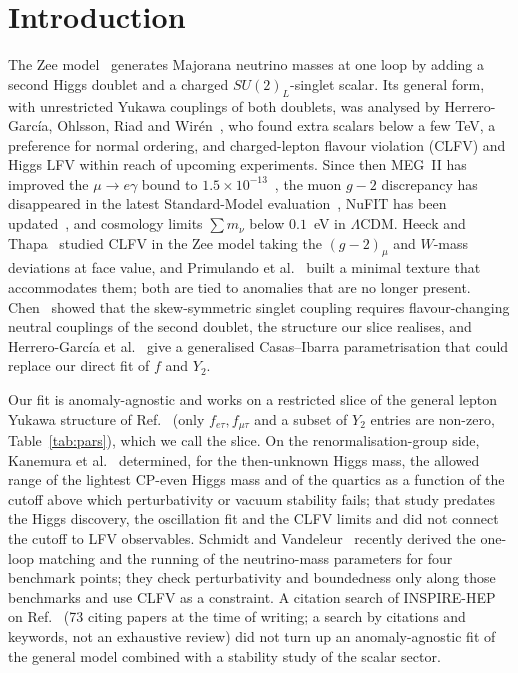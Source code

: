\documentclass[twocolumn,epjc3]{svjour3}
\newcommand{\HG}{Ref.~\cite{HerreroGarcia:2017xdq}}
\begin{document}
\section{Introduction}
The Zee model~\cite{Zee:1980ai} generates Majorana neutrino masses at one loop by adding a second Higgs doublet and a charged $SU(2)_L$-singlet scalar. Its general form, with unrestricted Yukawa couplings of both doublets, was analysed by Herrero-Garc\'ia, Ohlsson, Riad and Wir\'en~\cite{HerreroGarcia:2017xdq}, who found extra scalars below a few TeV, a preference for normal ordering, and charged-lepton flavour violation (CLFV) and Higgs LFV within reach of upcoming experiments. Since then MEG~II has improved the $\mu\to e\gamma$ bound to $1.5\times10^{-13}$~\cite{MEGII:2025gzr}, the muon $g-2$ discrepancy has disappeared in the latest Standard-Model evaluation~\cite{Aliberti:2025beg}, NuFIT has been updated~\cite{Esteban:2024eli}, and cosmology limits $\sum m_\nu$ below $0.1$~eV in $\Lambda$CDM. Heeck and Thapa~\cite{Heeck:2023soj} studied CLFV in the Zee model taking the $(g-2)_\mu$ and $W$-mass deviations at face value, and Primulando et al.~\cite{Primulando:2022vig} built a minimal texture that accommodates them; both are tied to anomalies that are no longer present. Chen~\cite{Chen:2025yuk} showed that the skew-symmetric singlet coupling requires flavour-changing neutral couplings of the second doublet, the structure our slice realises, and Herrero-Garc\'ia et al.~\cite{HerreroGarcia:2025ci} give a generalised Casas--Ibarra parametrisation that could replace our direct fit of $f$ and $Y_2$.

Our fit is anomaly-agnostic and works on a restricted slice of the general lepton Yukawa structure of \HG{} (only $f_{e\tau},f_{\mu\tau}$ and a subset of $Y_2$ entries are non-zero, Table~\ref{tab:pars}), which we call the slice. On the renormalisation-group side, Kanemura et al.~\cite{Kanemura:2000bq} determined, for the then-unknown Higgs mass, the allowed range of the lightest CP-even Higgs mass and of the quartics as a function of the cutoff above which perturbativity or vacuum stability fails; that study predates the Higgs discovery, the oscillation fit and the CLFV limits and did not connect the cutoff to LFV observables. Schmidt and Vandeleur~\cite{Schmidt:2025run} recently derived the one-loop matching and the running of the neutrino-mass parameters for four benchmark points; they check perturbativity and boundedness only along those benchmarks and use CLFV as a constraint. A citation search of INSPIRE-HEP on \HG{} (73 citing papers at the time of writing; a search by citations and keywords, not an exhaustive review) did not turn up an anomaly-agnostic fit of the general model combined with a stability study of the scalar sector.
\end{document}
